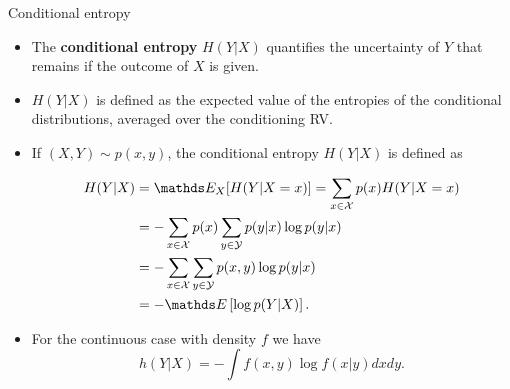 \documentclass[11pt,compress,t,notes=noshow, xcolor=table]{beamer}
\begin{document}
\begin{vbframe}{Conditional entropy}
\begin{itemize}

\item The \textbf{conditional entropy} $H(Y|X)$ quantifies the uncertainty of $Y$ that remains if the outcome of $X$ is given.

\item $H(Y|X)$ is defined as the expected value of the entropies of the conditional distributions, averaged over the conditioning RV.
\item If $(X, Y) \sim p(x, y)$, the conditional entropy $H (Y|X)$ is defined as


\vspace{-0.2cm}
\footnotesize
\begin{equation*}\begin{aligned}
H(Y | X) &= \E_X[H(Y|X=x)] = \sum_{x \in \Xspace} p(x) H(Y | X=x) \\
&=-\sum_{x \in \Xspace} p(x) \sum_{y \in \Yspace} p(y | x) \log p(y | x) \\
&=-\sum_{x \in \Xspace} \sum_{y \in \Yspace} p(x, y) \log p(y | x) \\
&=-\E \left[\log p(Y | X) \right]. 
\end{aligned}\end{equation*}
\normalsize

\item For the continuous case with density $f$ we have $$h(Y|X) = - \int f(x,y) \log f(x|y) dx dy.$$
\end{itemize}

\end{vbframe}
\end{document}
